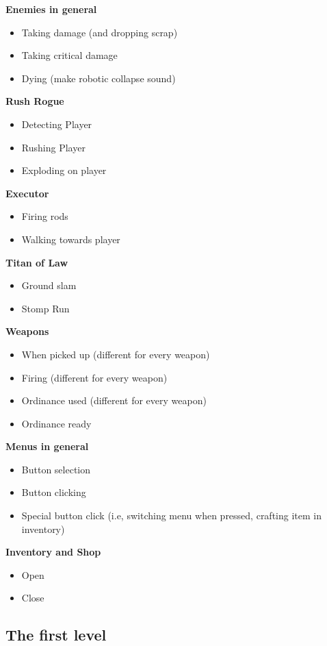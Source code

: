 \documentclass[../Main.tex]{subfiles}
\begin{document}
\textbf{Enemies in general}
\begin{itemize}
	\item Taking damage (and dropping scrap)
	\item Taking critical damage
	\item Dying (make robotic collapse sound)
\end{itemize}

\textbf{Rush Rogue}
\begin{itemize}
	\item Detecting Player
	\item Rushing Player
	\item Exploding on player
\end{itemize}

\textbf{Executor}
\begin{itemize}
	\item Firing rods
	\item Walking towards player
\end{itemize}

\textbf{Titan of Law}
\begin{itemize}
	\item Ground slam
	\item Stomp Run
\end{itemize}

\textbf{Weapons}
\begin{itemize}
	\item When picked up (different for every weapon)
	\item Firing (different for every weapon)
	\item Ordinance used (different for every weapon)
	\item Ordinance ready
\end{itemize}

\textbf{Menus in general}
\begin{itemize}
	\item Button selection
	\item Button clicking
	\item Special button click (i.e, switching menu when pressed, crafting item in inventory)
\end{itemize}


\textbf{Inventory and Shop}
\begin{itemize}
	\item Open
	\item Close
\end{itemize}

\subsection{The first level}
\end{document}
